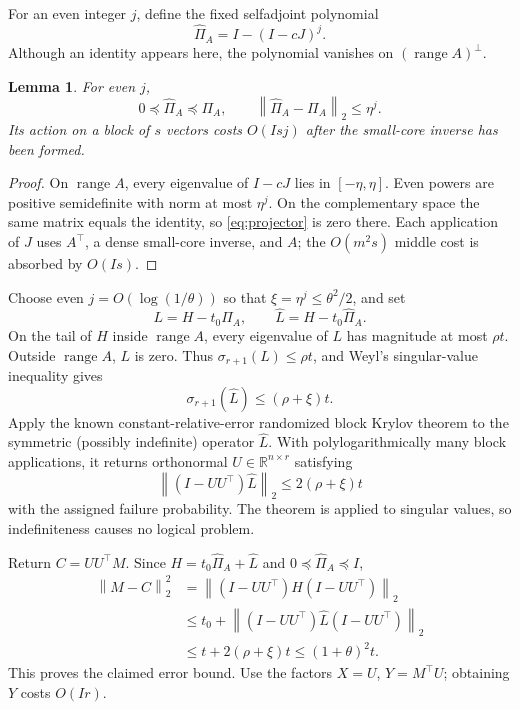 \documentclass[11pt]{article}
\newtheorem{lemma}[theorem]{Lemma}
\newcommand{\R}{\mathbb R}
\newcommand{\norm}[1]{\left\lVert #1\right\rVert}
\newcommand{\range}{\operatorname{range}}
\begin{document}
For an even integer \(j\), define the fixed selfadjoint polynomial
\begin{equation}\label{eq:projector}
 \widehat\Pi_A=I-(I-cJ)^j.
\end{equation}
Although an identity appears here, the polynomial vanishes on
\((\range A)^\perp\).
\begin{lemma}\label{lem:projector}
For even \(j\),
\[
 0\preceq\widehat\Pi_A\preceq\Pi_A,
 \qquad \norm{\widehat\Pi_A-\Pi_A}_2\le\eta^j.
\]
Its action on a block of \(s\) vectors costs \(O(Isj)\) after
the small-core inverse has been formed.
\end{lemma}
\begin{proof}
On \(\range A\), every eigenvalue of \(I-cJ\) lies in
\([-\eta,\eta]\). Even powers are positive semidefinite with norm
at most \(\eta^j\). On the complementary space the same matrix
equals the identity, so \eqref{eq:projector} is zero there. Each
application of \(J\) uses \(A^\top\), a dense small-core inverse,
and \(A\); the \(O(m^2s)\) middle cost is absorbed by \(O(Is)\).
\end{proof}

Choose even \(j=O(\log(1/\theta))\) so that
\(\xi=\eta^j\le\theta^2/2\), and set
\[
 L=H-t_0\Pi_A,\qquad
 \widehat L=H-t_0\widehat\Pi_A.
\]
On the tail of \(H\) inside \(\range A\), every eigenvalue of
\(L\) has magnitude at most \(\rho t\). Outside \(\range A\),
\(L\) is zero. Thus \(\sigma_{r+1}(L)\le\rho t\), and Weyl's
singular-value inequality gives
\[
 \sigma_{r+1}(\widehat L)\le(\rho+\xi)t.
\]
Apply the known constant-relative-error randomized block Krylov theorem to
the symmetric (possibly indefinite) operator \(\widehat L\). With
polylogarithmically many block applications, it returns orthonormal
\(U\in\R^{n\times r}\) satisfying
\[
 \norm{(I-UU^\top)\widehat L}_2\le2(\rho+\xi)t
\]
with the assigned failure probability. The theorem is applied to singular
values, so indefiniteness causes no logical problem.

Return \(C=UU^\top M\). Since
\(H=t_0\widehat\Pi_A+\widehat L\) and
\(0\preceq\widehat\Pi_A\preceq I\),
\begin{align*}
 \norm{M-C}_2^2
 &=\norm{(I-UU^\top)H(I-UU^\top)}_2\\
 &\le t_0+\norm{(I-UU^\top)\widehat L(I-UU^\top)}_2\\
 &\le t+2(\rho+\xi)t
 \le(1+\theta)^2t.
\end{align*}
This proves the claimed error bound. Use the factors
\(X=U\), \(Y=M^\top U\); obtaining \(Y\) costs \(O(Ir)\).
\end{document}
